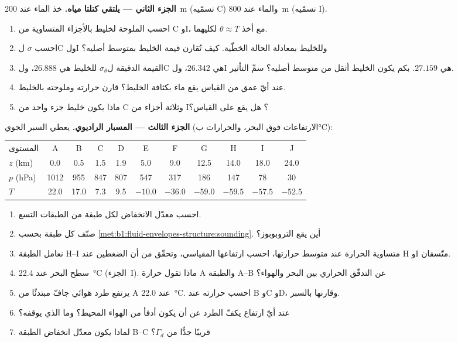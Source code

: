 \begin{problem}
\medskip
\noindent\textbf{الجزء الثاني --- يلتقي كتلتا مياه.} خذ الماء عند \qty{200}{m} (نسمّيه C) والماء عند \qty{800}{m} (نسمّيه I).
\begin{enumerate}[resume]
  \item احسب الملوحة  لخليط بالأجزاء المتساوية من C وI، مع أخذ $\theta \approx T$ لكليهما.
  \item احسب $\sigma$ لC ولI وللخليط بمعادلة الحالة الخطّية. كيف تُقارن قيمة الخليط بمتوسط أصليه؟
  \item القيمة الدقيقة ل$\sigma_\theta$ للخليط هي $26.888$، ولC هي $26.342$، ولI هي $27.159$. بكم يكون الخليط أثقل من متوسط أصليه؟ سمِّ التأثير.
  \item عند أيّ عمق من القياس يقع ماء بكثافة الخليط؟ قارن حرارته وملوحته بالخليط.
  \item ماذا يكون خليط جزء واحد من C وثلاثة أجزاء من I؟ هل يقع على القياس؟
\end{enumerate}

\medskip
\noindent\textbf{الجزء الثالث --- المسبار الراديوي.} يعطي السبر الجوي (الارتفاعات فوق البحر، والحرارات ب\si{\celsius}):
\begin{center}
\small
\setlength{\tabcolsep}{4pt}
\begin{tabular}{|l|cccccccccc|}
\hline
المستوى & A & B & C & D & E & F & G & H & I & J \\
$z$ (km) & 0.0 & 0.5 & 1.5 & 1.9 & 5.0 & 9.0 & 12.5 & 14.0 & 18.0 & 24.0 \\
$p$ (hPa) & 1012 & 955 & 847 & 807 & 547 & 317 & 186 & 147 & 78 & 30 \\
$T$ & 22.0 & 17.0 & 7.3 & 9.5 & $-10.0$ & $-36.0$ & $-59.0$ & $-59.5$ & $-57.5$ & $-52.5$ \\
\hline
\end{tabular}
\end{center}
\begin{enumerate}[resume]
  \item احسب معدّل الانخفاض لكل طبقة من الطبقات التسع.
  \item صنّف كل طبقة بحسب \cref{met:b1:fluid-envelopes-structure:sounding}. أين يقع التروبوبوز؟
  \item نعامل الطبقة H--I متساوية الحرارة عند متوسط حرارتها، احسب ارتفاعها المقياسي، وتحقّق من أن الضغطين عند H وI متّسقان.
  \item سطح البحر عند \qty{22.4}{\celsius} (الجزء~I). ماذا تقول حرارة A والطبقة A--B عن التدفّق الحراري بين البحر والهواء؟
  \item يرتفع طرد هوائي جافّ مبتدئًا من A عند \qty{22.0}{\celsius}. احسب حرارته عند B وC وD، وقارنها بالسبر.
  \item عند أيّ ارتفاع يكفّ الطرد عن أن يكون أدفأ من الهواء المحيط؟ وما الذي يوقفه؟
  \item لماذا يكون معدّل انخفاض الطبقة B--C قريبًا جدًّا من $\Gamma_d$؟
\end{enumerate}


\end{problem}
